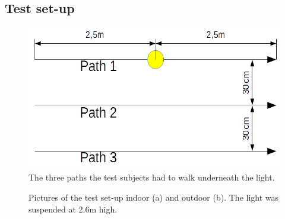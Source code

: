 \subsection{Test set-up}

\begin{figure}
	\includegraphics[width=\textwidth]{pics/Evaluation_paths.png}
	\caption{The three paths the test subjects had to walk underneath the light.}
	\label{fig:Evaluation_paths}
\end{figure}

\begin{figure}
	\centering     %
	\label{fig:TestPicture}
	\caption{Pictures of the test set-up indoor (a) and outdoor (b). The light was suspended at 2.6m high.}
\end{figure}

